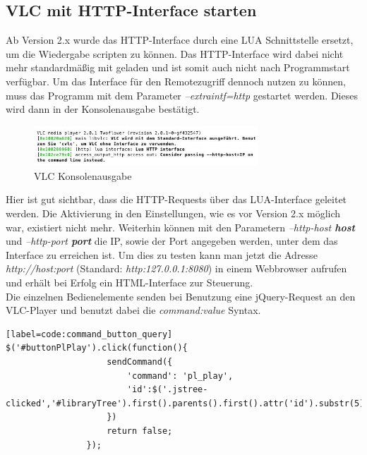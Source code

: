 \documentclass[a4paper,12pt]{article}
\begin{document}
\subsection{VLC mit HTTP-Interface starten}
Ab Version 2.x wurde das HTTP-Interface durch eine LUA Schnittstelle ersetzt, um die Wiedergabe scripten zu können. Das HTTP-Interface wird dabei nicht mehr standardmäßig mit geladen und ist somit auch nicht nach Programmstart verfügbar. Um das Interface für den Remotezugriff dennoch nutzen zu können,  muss das Programm mit dem Parameter \textit{--extraintf=http} gestartet werden. Dieses wird dann in der Konsolenausgabe bestätigt. \\
\begin{figure}[H]
\centering
\includegraphics[width=0.75\textwidth]{cli-output.jpg}
\caption{VLC Konsolenausgabe}
\end{figure}
Hier ist gut sichtbar, dass die HTTP-Requests über das LUA-Interface geleitet werden. Die Aktivierung in den Einstellungen, wie es vor Version 2.x möglich war, existiert nicht mehr. Weiterhin können mit den Parametern  \textit{--http-host \textbf{host}} und \textit{--http-port \textbf{port}} die IP, sowie der Port angegeben werden, unter dem das Interface zu erreichen ist. Um dies zu testen kann man jetzt die Adresse \textit{http://host:port} (Standard: \textit{http:127.0.0.1:8080}) in einem Webbrowser aufrufen und erhält bei Erfolg ein HTML-Interface zur Steuerung. \\
Die einzelnen Bedienelemente senden bei Benutzung eine jQuery-Request an den VLC-Player und benutzt dabei die \textit{command:value} Syntax.
\begin{lstlisting}[caption=Play Button Command][label=code:command_button_query]
$('#buttonPlPlay').click(function(){
					sendCommand({
						'command': 'pl_play',
						'id':$('.jstree-clicked','#libraryTree').first().parents().first().attr('id').substr(5)
					})
					return false;
				});
\end{lstlisting}
\end{document}
